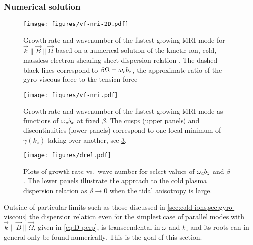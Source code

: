 \documentclass[aps,pre,notitlepage,amsmath,amssymb,amsfonts,nobibnotes,nofootinbib]{revtex4-1}
\begin{document}
\subsubsection{Numerical solution}

\begin{figure}
  \centering\texttt{[image: figures/vf-mri-2D.pdf]}
  \caption{Growth rate and wavenumber of the fastest growing MRI mode for
    $\vec{k}\bm{\parallel}\vec{B}\bm{\parallel}\vec{\Omega}$ based on a
    numerical solution of the kinetic ion, cold, massless electron shearing
    sheet dispersion relation . The dashed black lines
    correspond to $\beta\Omega=\omega_c{}b_z$, the approximate ratio of the
    gyro-viscous force to the tension force.}\label{fig:vf-mri-2D}
\end{figure}

\begin{figure}
  \centering\texttt{[image: figures/vf-mri.pdf]}
  \caption{Growth rate and wavenumber of the fastest growing MRI mode as
    functions of $\omega_c{}b_z$ at fixed $\beta$. The cusps (upper panels) and
    discontinuities (lower panels) correspond to one local minimum of
    $\gamma(k_z)$ taking over another, see \cref{fig:drel}.}\label{fig:vf-mri}
\end{figure}

\begin{figure}
  \centering\texttt{[image: figures/drel.pdf]}
  \caption{Plots of
    growth rate vs.\ wave number for select values of $\omega_c{}b_z$ and $\beta$.
    The lower panels illustrate the approach to the cold plasma dispersion
    relation as $\beta\to0$ when the tidal anisotropy is
    large.}\label{fig:drel}
\end{figure}

Outside of particular limits such as those discussed in
\cref{sec:cold-ions,sec:gyro-viscous} the dispersion relation even for the
simplest case of parallel modes with
$\vec{k}\bm{\parallel}\vec{B}\bm{\parallel}\vec{\Omega}$, given in
\cref{eq:D-perp}, is transcendental in $\omega$ and $k_z$ and its roots can in
general only be found numerically. This is the goal of this section.
\end{document}
